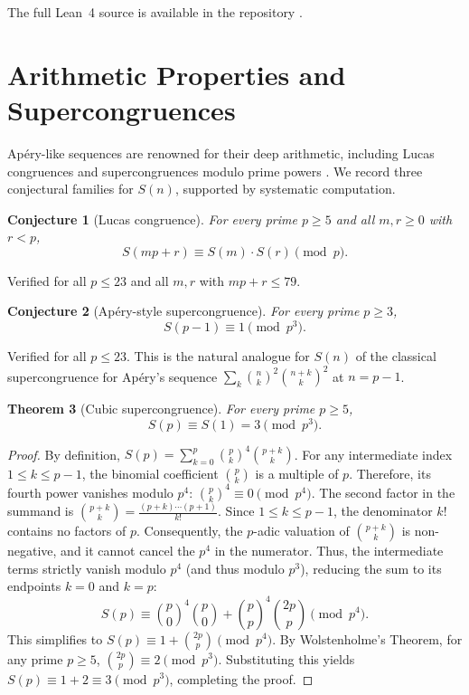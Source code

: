 \documentclass[11pt, a4paper]{article}
\newtheorem{theorem}{Theorem}
\newtheorem{conjecture}[theorem]{Conjecture}
\begin{document}
The full Lean~4 source is available in the repository \cite{repo}.


\section{Arithmetic Properties and Supercongruences}\label{sec:numbertheory}

Ap\'ery-like sequences are renowned for their deep arithmetic, including
Lucas congruences and supercongruences modulo prime powers
\cite{Straub2014,Osburn2016}.  We record three conjectural families for $S(n)$,
supported by systematic computation.

\begin{conjecture}[Lucas congruence]\label{conj:lucas}
For every prime $p\ge 5$ and all $m,r\ge 0$ with $r<p$,
\[
  S(mp+r) \equiv S(m)\cdot S(r) \pmod{p}.
\]
\end{conjecture}

Verified for all $p\le 23$ and all $m,r$ with $mp+r\le 79$.

\begin{conjecture}[Ap\'ery-style supercongruence]\label{conj:apery}
For every prime $p\ge 3$,
\[
  S(p-1) \equiv 1 \pmod{p^3}.
\]
\end{conjecture}

Verified for all $p\le 23$.  This is the natural analogue for $S(n)$ of
the classical supercongruence for Ap\'ery's sequence
$\sum_k\binom{n}{k}^2\binom{n+k}{k}^2$ at $n=p-1$.

\begin{theorem}[Cubic supercongruence]\label{thm:cubic}
For every prime $p\ge 5$,
\[
  S(p) \equiv S(1) = 3 \pmod{p^3}.
\]
\end{theorem}

\begin{proof}
By definition, $S(p) = \sum_{k=0}^p \binom{p}{k}^4 \binom{p+k}{k}$. 
For any intermediate index $1 \le k \le p-1$, the binomial coefficient $\binom{p}{k}$ is a multiple of $p$. Therefore, its fourth power vanishes modulo $p^4$: $\binom{p}{k}^4 \equiv 0 \pmod{p^4}$. 
The second factor in the summand is $\binom{p+k}{k} = \frac{(p+k)\cdots(p+1)}{k!}$. Since $1 \le k \le p-1$, the denominator $k!$ contains no factors of $p$. Consequently, the $p$-adic valuation of $\binom{p+k}{k}$ is non-negative, and it cannot cancel the $p^4$ in the numerator.
Thus, the intermediate terms strictly vanish modulo $p^4$ (and thus modulo $p^3$), reducing the sum to its endpoints $k=0$ and $k=p$:
\[
  S(p) \equiv \binom{p}{0}^4 \binom{p}{0} + \binom{p}{p}^4 \binom{2p}{p} \pmod{p^4}.
\]
This simplifies to $S(p) \equiv 1 + \binom{2p}{p} \pmod{p^4}$. 
By Wolstenholme's Theorem, for any prime $p \ge 5$, $\binom{2p}{p} \equiv 2 \pmod{p^3}$. 
Substituting this yields $S(p) \equiv 1 + 2 \equiv 3 \pmod{p^3}$, completing the proof.
\end{proof}
\end{document}
